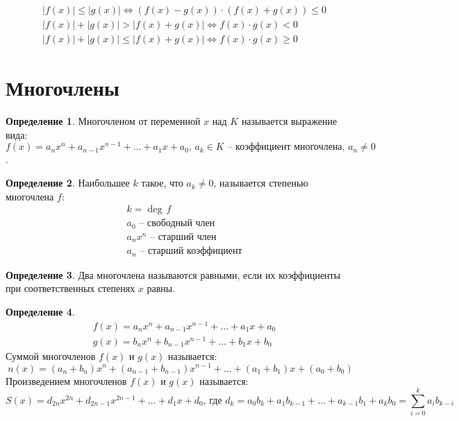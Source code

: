 \documentclass[12pt]{article}
\theoremstyle{definition}
\newtheorem{definition}{Определение}
\begin{document}
\begin{align*}
    &|f(x)|\leq|g(x)| \Longleftrightarrow (f(x)-g(x))\cdot(f(x)+g(x))\leq0\\
    &|f(x)|+|g(x)|>|f(x)+g(x)| \Longleftrightarrow f(x)\cdot g(x) < 0\\
    &|f(x)|+|g(x)|\leq|f(x)+g(x)| \Longleftrightarrow f(x)\cdot g(x) \geq 0
\end{align*}

\section{Многочлены}

\begin{definition}
    Многочленом от переменной $x$ над $K$ называется выражение вида: $f(x)=a_nx^n+a_{n-1}x^{n-1}+\ldots+a_1x+a_0,\, a_k\in K\text{ -- коэффициент многочлена},\, a_n\neq0$.
\end{definition}

\begin{definition}
    Наибольшее $k$ такое, что $a_k\neq0$, называется степенью многочлена $f$:
    \begin{align*}
        &k = \deg\,f\\
        &a_0\text{ -- свободный член}\\
        &a_nx^n\text{ -- старший член}\\
        &a_n\text{ -- старший коэффициент}
    \end{align*}
\end{definition}

\begin{definition}
    Два многочлена называются равными, если их коэффициенты при соответственных степенях $x$ равны.
\end{definition}

\begin{definition}
    \begin{align*}
        &f(x)=a_nx^n+a_{n-1}x^{n-1}+\ldots+a_1x+a_0\\
        &g(x)=b_nx^n+b_{n-1}x^{n-1}+\ldots+b_1x+b_0
    \end{align*}
    Суммой многочленов $f(x)$ и $g(x)$ называется: $$n(x)=(a_n+b_n)x^n+(a_{n-1}+b_{n-1})x^{n-1}+\ldots+(a_1+b_1)x+(a_0+b_0)$$ Произведением многочленов $f(x)$ и $g(x)$ называется: $$S(x)=d_{2n}x^{2n}+d_{2n-1}x^{2n-1}+\ldots+d_1x+d_0\text{, где } d_k=a_0b_k+a_1b_{k-1}+\ldots+a_{k-1}b_1+a_kb_0=\sum_{i=0}^ka_ib_{k-i}$$
\end{definition}
\end{document}
